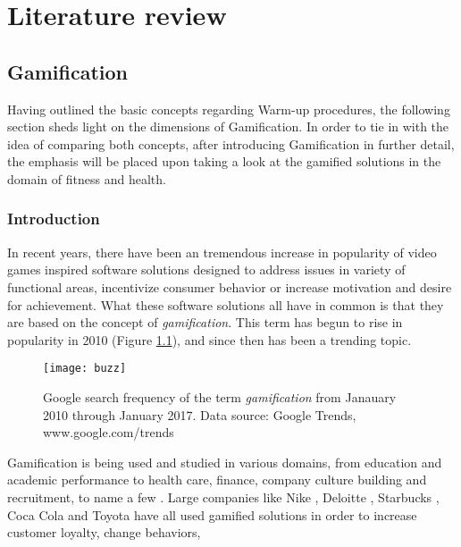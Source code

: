 \chapter{Literature review}\label{chapter:gamification}
\section{Gamification}
Having outlined the basic concepts regarding Warm-up procedures, the following section sheds light 
on the dimensions of Gamification. In order to tie in with the idea of comparing both concepts, after  introducing Gamification in further detail, the emphasis will be placed upon taking a look at the 
gamified solutions in the domain of fitness and health. 
\subsection{Introduction}
In recent years, there have been an tremendous increase in popularity of video games inspired software solutions designed to address issues in variety of functional areas, incentivize consumer behavior or increase motivation and desire for achievement. What these software solutions all have in common is that they are based on the concept of \textit{gamification}. This term has begun to rise in popularity in 2010 (Figure \ref{fig:buzz}), and since then has been a trending topic. %
\begin{figure}[h]
    \centering
    \texttt{[image: buzz]}
    \caption{Google search frequency of the term \textit{gamification} from Janauary 2010 through January 2017. Data source: Google Trends, www.google.com/trends}
    \label{fig:buzz}
\end{figure}
Gamification is being used and studied in various domains, from education and academic performance to health care, finance, company culture building and recruitment, to name a few \cite{gamificationExamples, gamificationWiki, enterpriseGamify}. Large companies like Nike \cite{nikePlus}, Deloitte \cite{deloitte}, Starbucks \cite{starbucks}, Coca Cola \cite{coke} and Toyota \cite{toyota} have all used gamified solutions in order to increase customer loyalty, change behaviors, 
